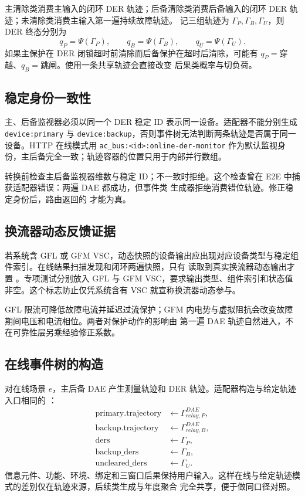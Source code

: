 主清除类消费主输入的闭环 DER 轨迹；后备清除类消费后备输入的闭环 DER 轨迹；未清除类消费主输入第一遍持续故障轨迹。
记三组轨迹为 $\Gamma_P,\Gamma_B,\Gamma_U$，则 DER 终态分别为
\begin{equation}
 q_P=\Psi(\Gamma_P),\qquad q_B=\Psi(\Gamma_B),\qquad
 q_U=\Psi(\Gamma_U).
\end{equation}
如果主保护在 DER 闭锁超时前清除而后备保护在超时后清除，可能有 $q_P=$穿越、$q_B=$跳闸。使用一条共享轨迹会直接改变
后果类概率与切负荷。

\subsection{稳定身份一致性}
主、后备监视器必须以同一个 DER 稳定 ID 表示同一设备。适配器不能分别生成
\verb|device:primary| 与 \verb|device:backup|，否则事件树无法判断两条轨迹是否属于同一设备。HTTP 在线模式用
\verb|ac_bus:<id>:online-der-monitor| 作为默认监视身份，主后备完全一致；轨迹容器的位置只用于内部并行数组。

转换前检查主后备监视器维数与稳定 ID；不一致时拒绝。这个检查曾在 E2E 中捕获适配器错误：两遍 DAE 都成功，但事件类
生成器拒绝消费错位轨迹。修正稳定身份后，路由返回的
 才能为真。

\subsection{换流器动态反馈证据}
若系统含 GFL 或 GFM VSC，动态快照的设备输出应出现对应设备类型与稳定组件索引。在线结果扫描发现和闭环两遍快照，只有
读取到真实换流器动态输出才置
。专项测试分别放入 GFL 与 GFM VSC，要求输出类型、组件索引和状态值
非空。这个标志防止仅凭系统含有 VSC 就宣称换流器动态参与。

GFL 限流可降低故障电流并延迟过流保护；GFM 内电势与虚拟阻抗会改变故障期间电压和电流相位。两者对保护动作的影响由
第一遍 DAE 轨迹自然进入，不在可靠性层另乘经验修正系数。

\subsection{在线事件树的构造}
对在线场景 $e$，主后备 DAE 产生测量轨迹和 DER 轨迹。适配器构造与给定轨迹入口相同的
：
\begin{align}
 \text{primary.trajectory}&\leftarrow\Gamma_{relay,P}^{DAE},\\
 \text{backup.trajectory}&\leftarrow\Gamma_{relay,B}^{DAE},\\
 \text{ders}&\leftarrow\Gamma_{P},\\
 \text{backup\_ders}&\leftarrow\Gamma_{B},\\
 \text{uncleared\_ders}&\leftarrow\Gamma_{U}.
\end{align}
信息元件、功能、环境、绑定和三窗口后果保持用户输入。这样在线与给定轨迹模式的差别仅在轨迹来源，后续类生成与年度聚合
完全共享，便于做同口径对照。

